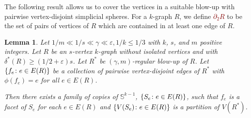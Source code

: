 \documentclass[12pt,reqno]{amsart}
\theoremstyle{plain}
\newtheorem{lemma}[theorem]{Lemma}
\theoremstyle{definition}
\numberwithin{equation}{section}
\DeclarePairedDelimiter{\set}{\{}{\}}
\renewcommand{\ge}{\geqslant}
\renewcommand{\le}{\leqslant}
\newcommand{\defn}[1]{\textcolor{Maroon}{\emph{#1}}}
\newcommand{\eps}{\varepsilon}
\newcommand{\comin}{\delta^{\ast}}
\newcommand{\bS}{\mathbb{S}}
\begin{document}
	The following result allows us to cover the vertices in a suitable blow-up with pairwise vertex-disjoint simplicial spheres.
	For a $k$-graph $R$, we define \defn{$\partial_2 R$} to be the set of pairs of vertices of $R$ which are contained in at least one edge of $R$.
	
	\begin{lemma}\label{lem:filling}
		Let $1/m \ll 1/s \ll \gamma \ll \eps, 1/k \le 1/3$ with $k$, $s$, and $m$ positive integers. Let $R$ be an $s$-vertex $k$-graph without isolated vertices and with $\comin(R) \ge (1/2 + \eps)s$.
		Let $R^\ast$ be {$(\gamma, m)$-regular blow-up} of $R$.
		Let $\set{f_e \colon e \in E(R)}$ be a collection of pairwise vertex-disjoint edges of $R^\ast$ with $\phi(f_e) = e$ for all $e \in E(R)$.
		
		Then there exists a family of copies of $\bS^{k - 1}$, $\set{S_e \colon e \in E(R)}$, such that $f_e$ is a facet of $S_e$ for each $e \in E(R)$ and $\set{V(S_e) \colon e \in E(R)}$ is a partition of $V(R^\ast)$.
	\end{lemma}
	
\end{document}
